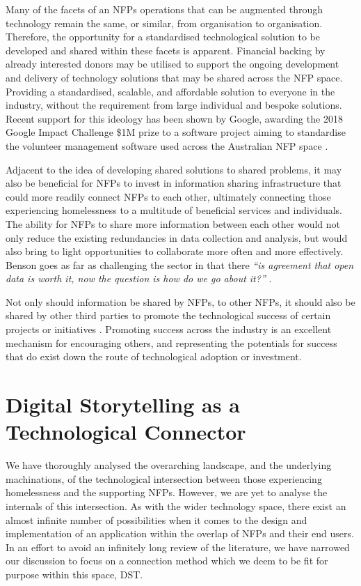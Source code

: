 Many of the facets of an NFPs operations that can be augmented through technology remain the same, or similar, from organisation to organisation. Therefore, the opportunity for a standardised technological solution to be developed and shared within these facets is apparent. Financial backing by already interested donors may be utilised to support the ongoing development and delivery of technology solutions that may be shared across the NFP space. Providing a standardised, scalable, and affordable solution to everyone in the industry, without the requirement from large individual and bespoke solutions. Recent support for this ideology has been shown by Google, awarding the 2018 Google Impact Challenge \$1M prize to a software project aiming to standardise the volunteer management software used across the Australian NFP space \cite{osa2018}.

Adjacent to the idea of developing shared solutions to shared problems, it may also be beneficial for NFPs to invest in information sharing infrastructure that could more readily connect NFPs to each other, ultimately connecting those experiencing homelessness to a multitude of beneficial services and individuals. The ability for NFPs to share more information between each other would not only reduce the existing redundancies in data collection and analysis, but would also bring to light opportunities to collaborate more often and more effectively. Benson goes as far as challenging the sector in that there \emph{“is agreement that open data is worth it, now the question is how do we go about it?”} \cite{van2015open}.

Not only should information be shared by NFPs, to other NFPs, it should also be shared by other third parties to promote the technological success of certain projects or initiatives \cite{van2015open}. Promoting success across the industry is an excellent mechanism for encouraging others, and representing the potentials for success that do exist down the route of technological adoption or investment.

\section{Digital Storytelling as a Technological Connector}

We have thoroughly analysed the overarching landscape, and the underlying machinations, of the technological intersection between those experiencing homelessness and the supporting NFPs. However, we are yet to analyse the internals of this intersection. As with the wider technology space, there exist an almost infinite number of possibilities when it comes to the design and implementation of an application within the overlap of NFPs and their end users. In an effort to avoid an infinitely long review of the literature, we have narrowed our  discussion to focus on a connection method which we deem to be fit for purpose within this space, DST.

